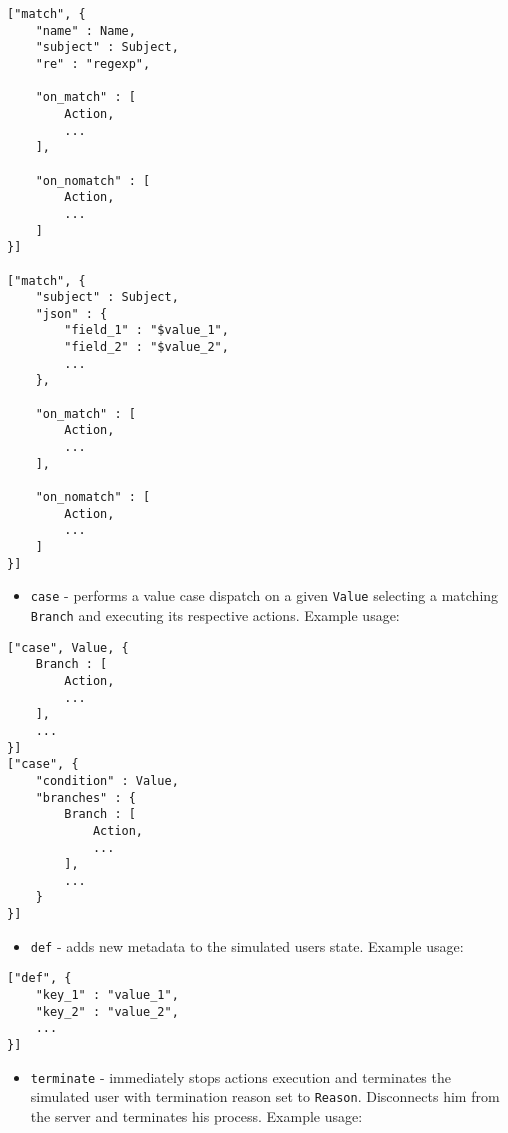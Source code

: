 \documentclass[a4paper]{article}
\begin{document}
\begin{verbatim}
["match", {
    "name" : Name,
    "subject" : Subject,
    "re" : "regexp",

    "on_match" : [
        Action,
        ...
    ],

    "on_nomatch" : [
        Action,
        ...
    ]
}]

["match", {
    "subject" : Subject,
    "json" : {
        "field_1" : "$value_1",
        "field_2" : "$value_2",
        ...
    },

    "on_match" : [
        Action,
        ...
    ],

    "on_nomatch" : [
        Action,
        ...
    ]
}]
\end{verbatim}





\begin{itemize}
\item \texttt{case} - performs a value case dispatch on a given \texttt{Value} selecting a matching \texttt{Branch} and executing its respective actions. Example usage:
\end{itemize}

\begin{verbatim}
["case", Value, {
    Branch : [
        Action,
        ...
    ],
    ...
}]
["case", {
    "condition" : Value,
    "branches" : {
        Branch : [
            Action,
            ...
        ],
        ...
    }
}]
\end{verbatim}





\begin{itemize}
\item \texttt{def} - adds new metadata to the simulated users state. Example usage:
\end{itemize}

\begin{verbatim}
["def", {
    "key_1" : "value_1",
    "key_2" : "value_2",
    ...
}]
\end{verbatim}





\begin{itemize}
\item \texttt{terminate} - immediately stops actions execution and terminates the simulated user with termination reason set to \texttt{Reason}. Disconnects him from the server and terminates his process. Example usage:
\end{itemize}
\end{document}
